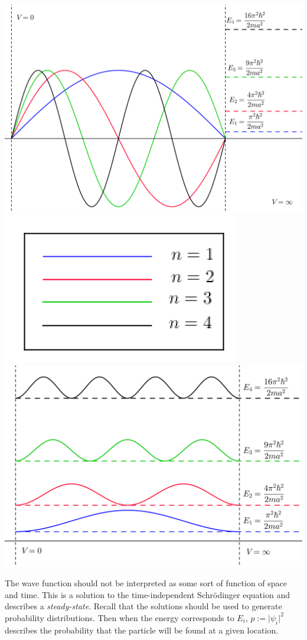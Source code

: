 \documentclass[12pt,]{book}
\begin{document}
\includegraphics{assets/graphics/1dbox-geo.png}
\includegraphics{assets/graphics/n.png}
\includegraphics{assets/graphics/1dbox-prob.png}

The wave function should not be interpreted as some sort of function of
space and time. This is a solution to the time-independent Schrödinger
equation and describes a \emph{steady-state}. Recall that the solutions
should be used to generate probability distributions. Then when the
energy corresponds to \(E_i\), \(p:=\rvert\psi_i\rvert^2\) describes the
probability that the particle will be found at a given location.
\end{document}
